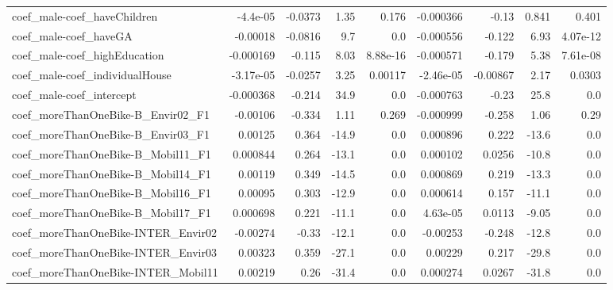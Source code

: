 \begin{tabular}{lrrrrrrrr}
coef\_male-coef\_haveChildren               &    -4.4e-05 &      -0.0373 &    1.35 &    0.176 &  -0.000366 &       -0.13 &        0.841 &         0.401 \\
coef\_male-coef\_haveGA                     &    -0.00018 &      -0.0816 &     9.7 &      0.0 &  -0.000556 &      -0.122 &         6.93 &      4.07e-12 \\
coef\_male-coef\_highEducation              &   -0.000169 &       -0.115 &    8.03 & 8.88e-16 &  -0.000571 &      -0.179 &         5.38 &      7.61e-08 \\
coef\_male-coef\_individualHouse            &   -3.17e-05 &      -0.0257 &    3.25 &  0.00117 &  -2.46e-05 &    -0.00867 &         2.17 &        0.0303 \\
coef\_male-coef\_intercept                  &   -0.000368 &       -0.214 &    34.9 &      0.0 &  -0.000763 &       -0.23 &         25.8 &           0.0 \\
coef\_moreThanOneBike-B\_Envir02\_F1         &    -0.00106 &       -0.334 &    1.11 &    0.269 &  -0.000999 &      -0.258 &         1.06 &          0.29 \\
coef\_moreThanOneBike-B\_Envir03\_F1         &     0.00125 &        0.364 &   -14.9 &      0.0 &   0.000896 &       0.222 &        -13.6 &           0.0 \\
coef\_moreThanOneBike-B\_Mobil11\_F1         &    0.000844 &        0.264 &   -13.1 &      0.0 &   0.000102 &      0.0256 &        -10.8 &           0.0 \\
coef\_moreThanOneBike-B\_Mobil14\_F1         &     0.00119 &        0.349 &   -14.5 &      0.0 &   0.000869 &       0.219 &        -13.3 &           0.0 \\
coef\_moreThanOneBike-B\_Mobil16\_F1         &     0.00095 &        0.303 &   -12.9 &      0.0 &   0.000614 &       0.157 &        -11.1 &           0.0 \\
coef\_moreThanOneBike-B\_Mobil17\_F1         &    0.000698 &        0.221 &   -11.1 &      0.0 &   4.63e-05 &      0.0113 &        -9.05 &           0.0 \\
coef\_moreThanOneBike-INTER\_Envir02        &    -0.00274 &        -0.33 &   -12.1 &      0.0 &   -0.00253 &      -0.248 &        -12.8 &           0.0 \\
coef\_moreThanOneBike-INTER\_Envir03        &     0.00323 &        0.359 &   -27.1 &      0.0 &    0.00229 &       0.217 &        -29.8 &           0.0 \\
coef\_moreThanOneBike-INTER\_Mobil11        &     0.00219 &         0.26 &   -31.4 &      0.0 &   0.000274 &      0.0267 &        -31.8 &           0.0 \\

\end{tabular}
